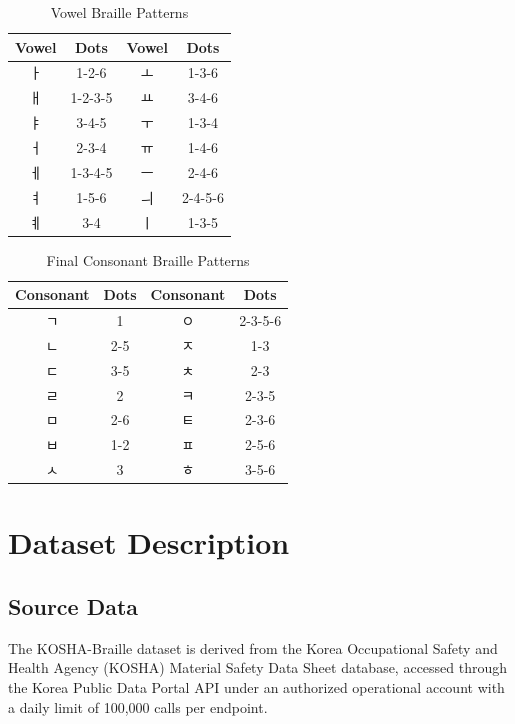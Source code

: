 \documentclass[journal]{IEEEtran}
\begin{document}
\begin{table}[h]
\centering
\caption{Vowel Braille Patterns}
\label{tab:jung}
\begin{tabular}{cccc}
\toprule
Vowel & Dots & Vowel & Dots \\
\midrule
{ㅏ} & 1-2-6 & {ㅗ} & 1-3-6 \\
{ㅐ} & 1-2-3-5 & {ㅛ} & 3-4-6 \\
{ㅑ} & 3-4-5 & {ㅜ} & 1-3-4 \\
{ㅓ} & 2-3-4 & {ㅠ} & 1-4-6 \\
{ㅔ} & 1-3-4-5 & {ㅡ} & 2-4-6 \\
{ㅕ} & 1-5-6 & {ㅢ} & 2-4-5-6 \\
{ㅖ} & 3-4 & {ㅣ} & 1-3-5 \\
\bottomrule
\end{tabular}
\end{table}

\begin{table}[h]
\centering
\caption{Final Consonant Braille Patterns}
\label{tab:jong}
\begin{tabular}{cccc}
\toprule
Consonant & Dots & Consonant & Dots \\
\midrule
{ㄱ} & 1 & {ㅇ} & 2-3-5-6 \\
{ㄴ} & 2-5 & {ㅈ} & 1-3 \\
{ㄷ} & 3-5 & {ㅊ} & 2-3 \\
{ㄹ} & 2 & {ㅋ} & 2-3-5 \\
{ㅁ} & 2-6 & {ㅌ} & 2-3-6 \\
{ㅂ} & 1-2 & {ㅍ} & 2-5-6 \\
{ㅅ} & 3 & {ㅎ} & 3-5-6 \\
\bottomrule
\end{tabular}
\end{table}

\section{Dataset Description}
\label{sec:dataset}

\subsection{Source Data}

The KOSHA-Braille dataset is derived from the Korea Occupational Safety and Health Agency (KOSHA) Material Safety Data Sheet database, accessed through the Korea Public Data Portal API \cite{data_go_kr} under an authorized operational account with a daily limit of 100,000 calls per endpoint.
\end{document}
